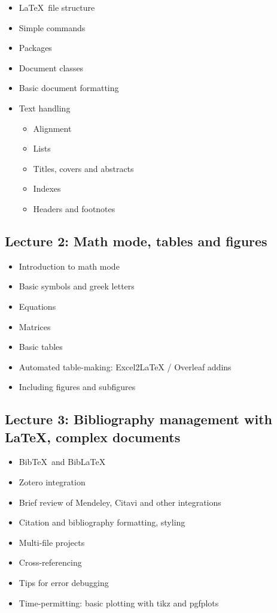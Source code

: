 \documentclass[a4paper,12pt]{article}
\begin{document}
\begin{itemize}
    \item \LaTeX \ file structure
    \item Simple commands
    \item Packages
    \item Document classes
    \item Basic document formatting
    \item Text handling
    \begin{itemize}
        \item Alignment
        \item Lists
        \item Titles, covers and abstracts
        \item Indexes
        \item Headers and footnotes 
    \end{itemize}
\end{itemize}

\subsection{Lecture 2: Math mode, tables and figures}

\begin{itemize}
    \item Introduction to math mode
    \item Basic symbols and greek letters
    \item Equations
    \item Matrices
    \item Basic tables
    \item Automated table-making: Excel2LaTeX / Overleaf addins
    \item Including figures and subfigures
\end{itemize}

\subsection{Lecture 3: Bibliography management with \LaTeX, complex documents}

\begin{itemize}
    \item Bib\TeX \ and Bib\LaTeX
    \item Zotero integration
    \item Brief review of Mendeley, Citavi and other integrations
    \item Citation and bibliography formatting, styling
    \item Multi-file projects
    \item Cross-referencing
    \item Tips for error debugging
    \item Time-permitting: basic plotting with \textsf{tikz} and \textsf{pgfplots}
\end{itemize}
\end{document}
